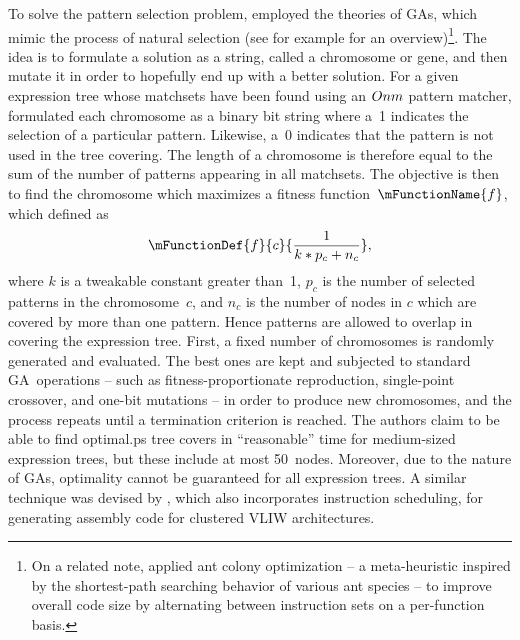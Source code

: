 {To solve the \gls{pattern selection} problem, \textcite{Shu1996} employed the
theories of \glspl{GA}, which mimic the process of natural selection (see for
example \cite{Reeves2010} for an overview)\footnote{On a related note,
  \textcite{Wu2006} applied \gls{ant colony optimization} -- a meta-heuristic
  inspired by the shortest-path searching behavior of various ant species
  \cite{Dorigo2010} -- to improve overall code size by alternating between
  \glspl{instruction set} on a per-function basis.}.
%
The idea is to formulate a
solution as a string, called a \gls{chromosome} or \gls{gene}, and then mutate
it in order to hopefully end up with a better solution.
%
For a given \gls{expression tree} whose \glspl{matchset} have been found using an \mbox{$O{nm}$}
\gls{pattern matcher}, \citeauthor{Shu1996} formulated each \gls{chromosome} as
a binary bit string where a~1 indicates the selection of a particular
\gls{pattern}.
%
Likewise, a~0 indicates that the \gls{pattern} is not used in the
\gls{tree covering}.
%
The length of a \gls{chromosome} is therefore equal to the
sum of the number of \glspl{pattern} appearing in all \glspl{matchset}.
%
The
objective is then to find the \gls{chromosome} which maximizes a \gls{fitness
  function}~$\mFunctionName{f}$, which \citeauthor{Shu1996} defined as%
%
\def\numPats#1{p_{#1}}%
\def\multCov#1{n_{#1}}%
\begin{displaymath}
  \mFunctionDef{f}{c}{\frac{1}{k * \numPats{c} + \multCov{c}}},
\end{displaymath}
%
where $k$ is a tweakable constant greater than~1, $\numPats{c}$ is the number of
selected \glspl{pattern} in the \gls{chromosome}~$c$, and $\multCov{c}$ is the
number of \glspl{node} in $c$ which are covered by more than one
\gls{pattern}.
%
Hence \glspl{pattern} are allowed to overlap in covering the
\gls{expression tree}.
%
First, a fixed number of \glspl{chromosome} is randomly
generated and evaluated.
%
The best ones are kept and subjected to standard
\gls{GA}~operations -- such as fitness-proportionate reproduction, single-point
crossover, and one-bit mutations -- in order to produce new \glspl{chromosome},
and the process repeats until a termination criterion is reached.
%
The authors
claim to be able to find \gls{optimal.ps} \gls{tree} covers in
``reasonable'' time for medium-sized \glspl{expression tree}, but these include at
most 50~\glspl{node}.
%
Moreover, due to the nature of \glspl{GA}, optimality
cannot be guaranteed for all \glspl{expression tree}.
%
A similar technique was
devised by \textcite{Eriksson2008}, which also incorporates \gls{instruction
  scheduling}, for generating \gls{assembly code} for clustered \gls{VLIW}
architectures.


}
